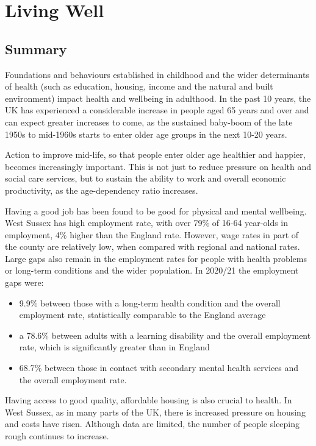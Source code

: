 \section{Living Well}
\subsection{Summary}
Foundations and behaviours established in childhood and the wider determinants of health (such as education, housing, income and the natural and built environment) impact health and wellbeing in adulthood. In the past 10 years, the UK has experienced a considerable increase in people aged 65 years and over and can expect greater increases to come, as the sustained baby-boom of the late 1950s to mid-1960s starts to enter older age groups in the next 10-20 years.

Action to improve mid-life, so that people enter older age healthier and happier, becomes increasingly important. This is not just to reduce pressure on health and social care services, but to sustain the ability to work and overall economic productivity, as the age-dependency ratio increases.

Having a good job has been found to be good for physical and mental wellbeing. West Sussex has high employment rate, with over 79\% of 16-64 year-olds in employment, 4\% higher than the England rate. However, wage rates in part of the county are relatively low, when compared with regional and national rates. Large gaps also remain in the employment rates for people with health problems or long-term conditions and the wider population. In 2020/21 the employment gaps were:

\begin{itemize}[noitemsep]
    \item 9.9\% between those with a long-term health condition and the overall employment rate, statistically comparable to the England average
    \item a 78.6\% between adults with a learning disability and the overall employment rate, which is significantly greater than in England
    \item 68.7\% between those in contact with secondary mental health services and the overall employment rate.
\end{itemize}

Having access to good quality, affordable housing is also crucial to health. In West Sussex, as in many parts of the UK, there is increased pressure on housing and costs have risen. Although data are limited, the number of people sleeping rough continues to increase.%

